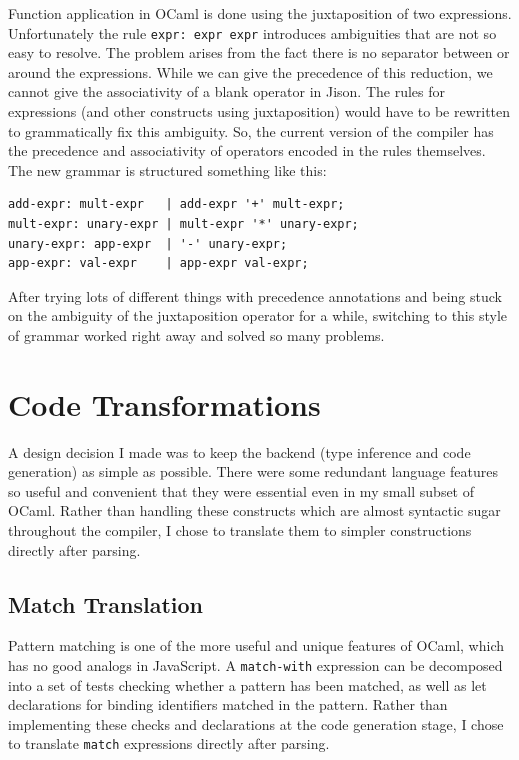 \documentclass[12pt,a4paper,twoside,openright]{report}
\begin{document}
Function application in OCaml is done using the juxtaposition of two expressions.
Unfortunately the rule {\tt expr: expr expr} introduces ambiguities that are not so easy to resolve.
The problem arises from the fact there is no separator between or around the expressions.
While we can give the precedence of this reduction, we cannot give the associativity of a blank operator in Jison.
The rules for expressions (and other constructs using juxtaposition) would have to be rewritten to grammatically fix this ambiguity.
So, the current version of the compiler has the precedence and associativity of operators encoded in the rules themselves.
The new grammar is structured something like this:
\begin{verbatim}
add-expr: mult-expr   | add-expr '+' mult-expr;
mult-expr: unary-expr | mult-expr '*' unary-expr;
unary-expr: app-expr  | '-' unary-expr;
app-expr: val-expr    | app-expr val-expr;
\end{verbatim}
After trying lots of different things with precedence annotations and being stuck on the ambiguity of the juxtaposition operator for a while, switching to this style of grammar worked right away and solved so many problems.

\section{Code Transformations}
A design decision I made was to keep the backend (type inference and code generation) as simple as possible.
There were some redundant language features so useful and convenient that they were essential even in my small subset of OCaml.
Rather than handling these constructs which are almost syntactic sugar throughout the compiler, I chose to translate them to simpler constructions directly after parsing.

\subsection{Match Translation}
Pattern matching is one of the more useful and unique features of OCaml, which has no good analogs in JavaScript.
A {\tt match-with} expression can be decomposed into a set of tests checking whether a pattern has been matched, as well as let declarations for binding identifiers matched in the pattern.
Rather than implementing these checks and declarations at the code generation stage, I chose to translate {\tt match} expressions directly after parsing.
\end{document}
